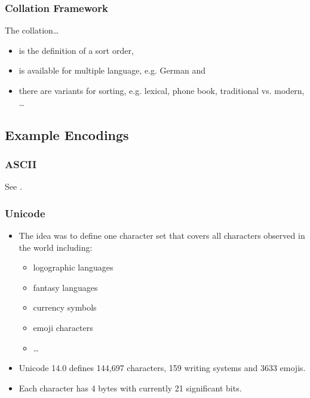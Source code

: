 			\subsubsection{Collation Framework} %
				The collation\dots
				\begin{itemize}
					\item is the definition of a sort order,
					\item is available for multiple language, e.g. German and
					\item there are variants for sorting, e.g. lexical, phone book, traditional vs. modern, \dots
				\end{itemize}

		\subsection{Example Encodings} %
			\subsubsection{ASCII} %
				See .

			\subsubsection{Unicode} %
				\begin{itemize}
					\item The idea was to define one character set that covers all characters observed in the world including:
						\begin{itemize}
							\item logographic languages
							\item fantasy languages
							\item currency symbols
							\item emoji characters
							\item \dots
						\end{itemize}
					\item Unicode 14.0 defines 144,697 characters, 159 writing systems and 3633 emojis.
					\item Each character has 4 bytes with currently 21 significant bits.
				\end{itemize}

